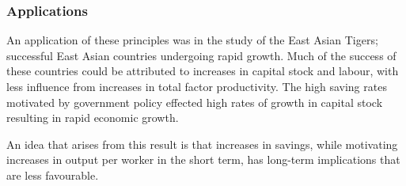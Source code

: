 \documentclass[12pt]{report}
\begin{document}
\begin{flushleft}
\subsubsection*{Applications}

An application of these principles was in the study of the East Asian Tigers;
successful East Asian countries undergoing rapid growth. Much of the success of
these countries could be attributed to increases in capital stock and labour,
with less influence from increases in total factor productivity. The high
saving rates motivated by government policy effected high rates of growth in
capital stock resulting in rapid economic growth. \par
An idea that arises from this result is that increases in savings, while
motivating increases in output per worker in the short term, has long-term
implications that are less favourable.

\end{flushleft}
\end{document}
